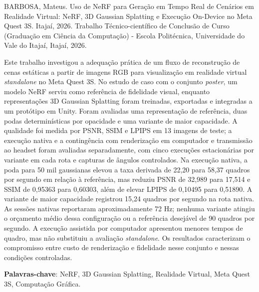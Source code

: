 \begin{Resumo}
BARBOSA, Mateus. Uso de NeRF para Geração em Tempo Real de Cenários em Realidade Virtual: NeRF, 3D Gaussian Splatting e Execução On-Device no Meta Quest 3S. Itajaí, 2026. Trabalho Técnico-científico de Conclusão de Curso (Graduação em Ciência da Computação) - Escola Politécnica, Universidade do Vale do Itajaí, Itajaí, 2026.

Este trabalho investigou a adequação prática de um fluxo de reconstrução de cenas estáticas a partir de imagens RGB para visualização em realidade virtual \textit{standalone} no Meta Quest 3S. No estudo de caso com o conjunto \textit{poster}, um modelo NeRF serviu como referência de fidelidade visual, enquanto representações 3D Gaussian Splatting foram treinadas, exportadas e integradas a um protótipo em Unity. Foram avaliadas uma representação de referência, duas podas determinísticas por opacidade e uma variante de maior capacidade. A qualidade foi medida por PSNR, SSIM e LPIPS em 13 imagens de teste; a execução nativa e a contingência com renderização em computador e transmissão ao headset foram avaliadas separadamente, com cinco execuções estacionárias por variante em cada rota e capturas de ângulos controlados. Na execução nativa, a poda para 50 mil gaussianas elevou a taxa derivada de 22,20 para 58,37 quadros por segundo em relação à referência, mas reduziu PSNR de 32,989 para 17,514 e SSIM de 0,95363 para 0,60303, além de elevar LPIPS de 0,10495 para 0,51890. A variante de maior capacidade registrou 15,24 quadros por segundo na rota nativa. As sessões nativas reportaram aproximadamente 72 Hz; nenhuma variante atingiu o orçamento médio dessa configuração ou a referência desejável de 90 quadros por segundo. A execução assistida por computador apresentou menores tempos de quadro, mas não substituiu a avaliação \textit{standalone}. Os resultados caracterizam o compromisso entre custo de renderização e fidelidade nesse conjunto e nessas condições controladas.

\textbf{Palavras-chave}: NeRF, 3D Gaussian Splatting, Realidade Virtual, Meta Quest 3S, Computação Gráfica.
\end{Resumo}

